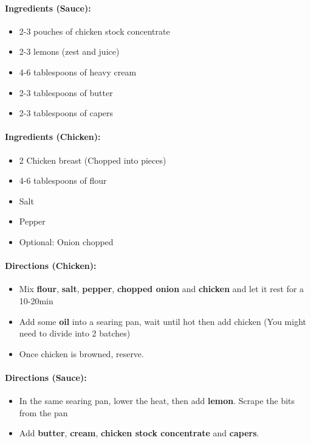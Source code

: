 \documentclass{article}
\begin{document}
\paragraph{Ingredients (Sauce):}
\begin{itemize}
    \item 2-3 pouches of chicken stock concentrate
    \item 2-3 lemons (zest and juice)
    \item 4-6 tablespoons of heavy cream
    \item 2-3 tablespoons of butter
    \item 2-3 tablespoons of capers
\end{itemize}  

\paragraph{Ingredients (Chicken):}
\begin{itemize}
    \item 2 Chicken breast (Chopped into pieces)
    \item 4-6 tablespoons of flour
    \item Salt
    \item Pepper
    \item Optional: Onion chopped
\end{itemize}  

\paragraph{Directions (Chicken):}
\begin{itemize}
    \item Mix \textbf{flour}, \textbf{salt}, \textbf{pepper}, \textbf{chopped onion} and \textbf{chicken} and let it rest for a 10-20min
    \item Add some \textbf{oil} into a searing pan, wait until hot then add chicken (You might need to divide into 2 batches)
    \item Once chicken is browned, reserve.
\end{itemize}  

\paragraph{Directions (Sauce):}
\begin{itemize}
    \item In the same searing pan, lower the heat, then add \textbf{lemon}. Scrape the bits from the pan
    \item Add \textbf{butter}, \textbf{cream}, \textbf{chicken stock concentrate} and \textbf{capers}.
\end{itemize} 
\end{document}

